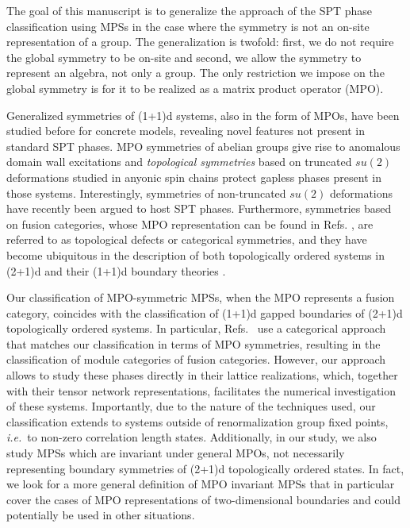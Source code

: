 \documentclass[a4paper,twocolumn,11pt,accepted=2023-02-10]{quantumarticle}
\begin{document}
The goal of this manuscript is to generalize the approach of the SPT phase classification using MPSs in the case where the symmetry is not an on-site representation of a group. The generalization is twofold: first, we do not require the global symmetry to be on-site and second, we allow the symmetry to represent an algebra, not only a group. The only restriction we impose on the global symmetry is for it to be realized as a matrix product operator (MPO). 


Generalized symmetries of (1+1)d systems, also in the form of MPOs, have been studied before for concrete models, revealing novel features not present in standard SPT phases. MPO symmetries of abelian groups give rise to anomalous domain wall excitations \cite{Roose19, Wang15A} and {\it topological symmetries} based on truncated $su(2)$ deformations studied in anyonic spin chains \cite{Feiguin07, Trebst08, Gils13} protect gapless phases present in those systems. Interestingly, symmetries of non-truncated $su(2)$ deformations have recently been argued to host SPT phases\cite{Quella20,Quella21}. Furthermore, symmetries based on fusion categories, whose MPO representation can be found in Refs. \cite{Sahinoglu14,Bultinck17A, Lootens21A}, are referred to as topological defects or categorical symmetries, and they have become ubiquitous in the description of both topologically ordered systems in (2+1)d and their (1+1)d boundary theories \cite{Kitaev12,hauru2016topological,aasen2016topological,vanhove2018mapping,Thorngren19,Aasen20,Ji21,vanhove2021topological,lootens2021category, Inamura22}. 

Our classification of MPO-symmetric MPSs, when the MPO represents a fusion category, coincides with the classification of (1+1)d gapped boundaries of (2+1)d topologically ordered systems. In particular, Refs.\ \cite{Kitaev12,Thorngren19} use a categorical approach that matches our classification in terms of MPO symmetries, resulting in the classification of  module categories of fusion categories. However, our approach allows to study these phases directly in their lattice realizations, which, together with their tensor network representations, facilitates the numerical investigation of these systems. Importantly, due to the nature of the techniques used, our classification extends to systems outside of renormalization group fixed points, {\it i.e.}\ to non-zero correlation length states. Additionally, in our study, we also study MPSs which are invariant under general MPOs, not necessarily representing boundary symmetries of (2+1)d topologically ordered states. In fact, we look for a more general definition of MPO invariant MPSs that in particular cover the cases of MPO representations of two-dimensional boundaries and could potentially be used in other situations.
\end{document}
